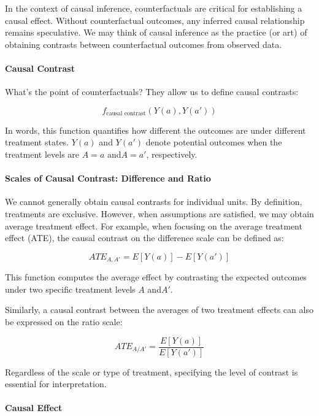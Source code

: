 \documentclass[
  singlecolumn]{article}
\let\oldparagraph\paragraph
\renewcommand{\paragraph}[1]{\oldparagraph{#1}\mbox{}}
\begin{document}
In the context of causal inference, counterfactuals are critical for
establishing a causal effect. Without counterfactual outcomes, any
inferred causal relationship remains speculative. We may think of causal
inference as the practice (or art) of obtaining contrasts between
counterfactual outcomes from observed data.

\paragraph{Causal Contrast}\label{causal-contrast}

What's the point of counterfactuals? They allow us to define causal
contrasts:

\[
f_{\text{causal contrast}}(Y(a), Y(a'))
\]

In words, this function quantifies how different the outcomes are under
different treatment states. \(Y(a)\) and \(Y(a')\) denote potential
outcomes when the treatment levels are \(A = a\) and\(A = a'\),
respectively.

\paragraph{Scales of Causal Contrast: Difference and
Ratio}\label{scales-of-causal-contrast-difference-and-ratio}

We cannot generally obtain causal contrasts for individual units. By
definition, treatments are exclusive. However, when assumptions are
satisfied, we may obtain average treatment effect. For example, when
focusing on the average treatment effect (ATE), the causal contrast on
the difference scale can be defined as:

\[
ATE_{A,A'} = E[Y(a)] - E[Y(a')]
\]

This function computes the average effect by contrasting the expected
outcomes under two specific treatment levels \(A\) and\(A'\).

Similarly, a causal contrast between the averages of two treatment
effects can also be expressed on the ratio scale:

\[
ATE_{A/A'} = \frac{E[Y(a)]}{E[Y(a')]}
\]

Regardless of the scale or type of treatment, specifying the level of
contrast is essential for interpretation.

\paragraph{\texorpdfstring{\textbf{Causal
Effect}}{Causal Effect}}\label{causal-effect}
\end{document}
